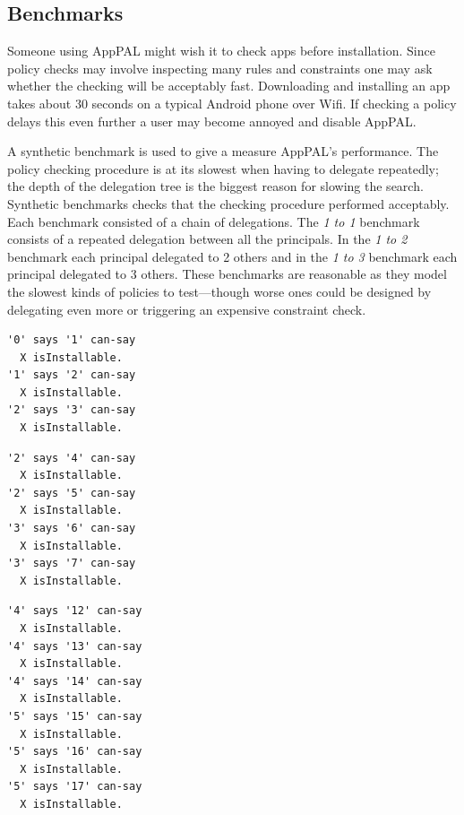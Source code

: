 \documentclass[thesis.tex]{subfiles}
\begin{document}
\subsection{Benchmarks}
\label{ssec:benchmarks}

Someone using AppPAL might wish it to check apps before installation.
Since policy checks may involve inspecting many rules and constraints one may ask whether the checking will be acceptably fast.
Downloading and installing an app takes about 30 seconds on a typical Android phone over Wifi.
If checking a policy delays this even further a user may become annoyed and disable AppPAL.

A synthetic benchmark is used to give a measure AppPAL's performance.
The policy checking procedure is at its slowest when having to delegate repeatedly;
  the depth of the delegation tree is the biggest reason for slowing the search.
Synthetic benchmarks checks that the checking procedure performed acceptably.
Each benchmark consisted of a chain of delegations.
The \emph{1 to 1} benchmark consists of a repeated delegation between all the principals.
In the \emph{1 to 2} benchmark each principal delegated to 2 others and in the \emph{1 to 3} benchmark each principal delegated to 3 others.
These benchmarks are reasonable as they model the slowest kinds of policies to test---though worse ones could be designed by delegating even more or triggering an expensive constraint check.

\noindent
\begin{minipage}{.32\textwidth}
\begin{lstlisting}[caption={Excerpt of policy from 1 to 1 benchmark.}, basicstyle=\ttfamily\footnotesize]
'0' says '1' can-say
  X isInstallable.
'1' says '2' can-say
  X isInstallable.
'2' says '3' can-say
  X isInstallable.
\end{lstlisting}
\end{minipage}\hfill
\begin{minipage}{.32\textwidth}
\begin{lstlisting}[caption={Excerpt of policy from 1 to 2 benchmark.}, basicstyle=\ttfamily\footnotesize]
'2' says '4' can-say
  X isInstallable.
'2' says '5' can-say
  X isInstallable.
'3' says '6' can-say
  X isInstallable.
'3' says '7' can-say
  X isInstallable.
\end{lstlisting}
\end{minipage}\hfill
\begin{minipage}{.32\textwidth}
\begin{lstlisting}[caption={Excerpt of policy from 1 to 3 benchmark.}, basicstyle=\ttfamily\footnotesize]
'4' says '12' can-say
  X isInstallable.
'4' says '13' can-say
  X isInstallable.
'4' says '14' can-say
  X isInstallable.
'5' says '15' can-say
  X isInstallable.
'5' says '16' can-say
  X isInstallable.
'5' says '17' can-say
  X isInstallable.
\end{lstlisting}
\end{minipage}
\end{document}
